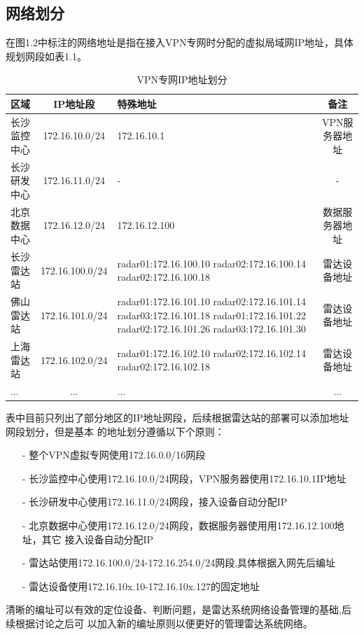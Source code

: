 \documentclass[a4paper,12pt]{report}
\begin{document}
\begin{spacing}{1.5}
\section{网络划分}
在图1.2中标注的网络地址是指在接入VPN专网时分配的虚拟局域网IP地址，具体规划网段如表1.1。
\begin{table}[hbtp]
	\centering
	\begin{tabular}{|l|c|p{5cm}|c|}
	\hline
	区域 & IP地址段 & 特殊地址 & 备注\\
	\hline
	长沙监控中心 & 172.16.10.0/24  & 172.16.10.1   & VPN服务器地址\\
	\hline
	长沙研发中心 & 172.16.11.0/24  & - & -\\
	\hline
	北京数据中心 & 172.16.12.0/24  & 172.16.12.100 & 数据服务器地址\\
	\hline
	长沙雷达站   & 172.16.100.0/24 & radar01:172.16.100.10 
									radar02:172.16.100.14 
									radar02:172.16.100.18 & 雷达设备地址\\
	\hline
	佛山雷达站   & 172.16.101.0/24 & radar01:172.16.101.10
									radar02:172.16.101.14 
									radar03:172.16.101.18 
									radar01:172.16.101.22
									radar02:172.16.101.26 
									radar03:172.16.101.30 & 雷达设备地址\\
	\hline
	上海雷达站   & 172.16.102.0/24 & radar01:172.16.102.10 
									radar02:172.16.102.14 
									radar02:172.16.102.18 & 雷达设备地址\\
	\hline
	...    		& ...             & ... & ...\\
	\hline
	\end{tabular}
	\caption{VPN专网IP地址划分}
	\label{tab:IPaddress}
\end{table}

表中目前只列出了部分地区的IP地址网段，后续根据雷达站的部署可以添加地址网段划分，但是基本
的地址划分遵循以下个原则：
\begin{itemize}
\itemsep=3pt
\parskip=0pt
\setlength{\itemindent}{1em} 
\item[-] 整个VPN虚拟专网使用172.16.0.0/16网段
\item[-] 长沙监控中心使用172.16.10.0/24网段，VPN服务器使用172.16.10.1IP地址
\item[-] 长沙研发中心使用172.16.11.0/24网段，接入设备自动分配IP
\item[-] 北京数据中心使用172.16.12.0/24网段，数据服务器使用用172.16.12.100地址，其它
接入设备自动分配IP
\item[-] 雷达站使用172.16.100.0/24-172.16.254.0/24网段,具体根据入网先后编址
\item[-] 雷达设备使用172.16.10x.10-172.16.10x.127的固定地址
\end{itemize}

清晰的编址可以有效的定位设备、判断问题，是雷达系统网络设备管理的基础,后续根据讨论之后可
以加入新的编址原则以便更好的管理雷达系统网络。


\end{spacing}
\end{document}
